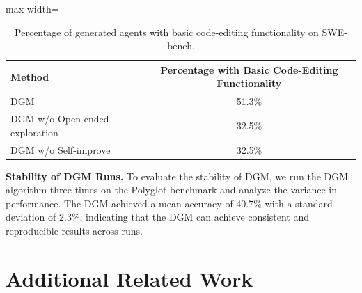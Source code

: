 \begin{table}[H]
\centering
\caption{Percentage of generated agents with basic code-editing functionality on SWE-bench.}
\begin{adjustbox}{max width=\textwidth}
\begin{tabular}{lc}
\toprule
\textbf{Method} & \textbf{Percentage with Basic Code-Editing Functionality} \\
\midrule
DGM & 51.3\% \\
DGM w/o Open-ended exploration & 32.5\% \\
DGM w/o Self-improve & 32.5\% \\
\bottomrule
\end{tabular}
\end{adjustbox}
\label{tab:code_editing}
\end{table}

\textbf{Stability of DGM Runs.}
To evaluate the stability of DGM, we run the DGM algorithm three times on the Polyglot benchmark and analyze the variance in performance. The DGM achieved a mean accuracy of 40.7\% with a standard deviation of 2.3\%, indicating that the DGM can achieve consistent and reproducible results across runs.


\section{Additional Related Work}
\label{app:related}

